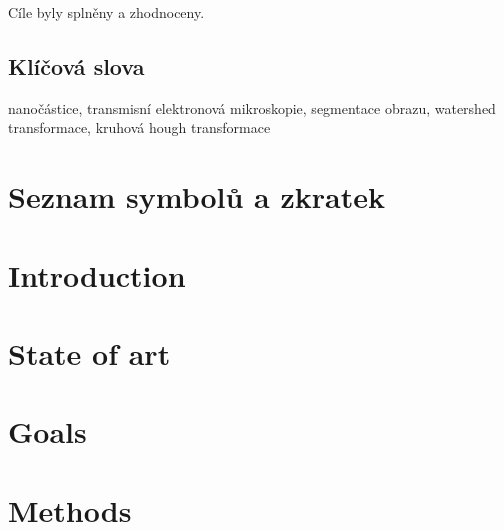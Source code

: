 \documentclass[a4paper,12pt]{article}   %
\numberwithin{equation}{section}        %
\begin{document}
    Cíle byly splněny a zhodnoceny.
     
	\subsection*{Klíčová slova}
		nanočástice, transmisní elektronová mikroskopie, segmentace obrazu, watershed transformace, kruhová hough transformace
	\clearpage
		
	
    \pagestyle{plain}	%
	
	\tableofcontents			%

	\clearpage

	\section*{Seznam symbolů a zkratek} %
	
	\clearpage
		
	
		
		\listoffigures 		%
		\clearpage
	
		\listofalgorithms
		\clearpage
  
        \section{Introduction}
        
        \clearpage
        
        \section{State of art}
        
        \clearpage
        
        \section{Goals}
        
        \clearpage
        
        \section{Methods}
        
        \clearpage
        
\end{document}
